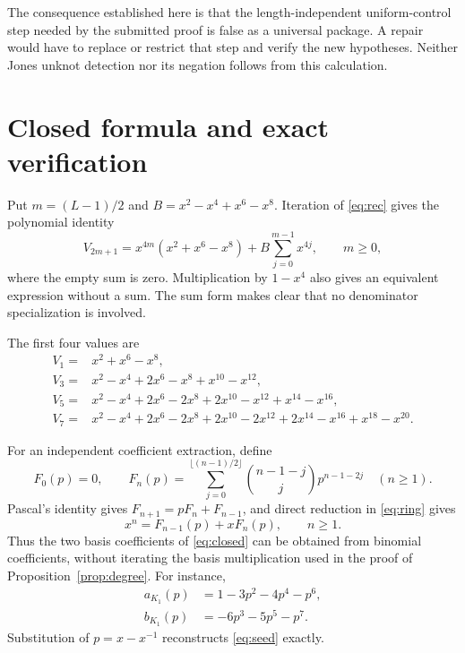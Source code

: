 \documentclass[11pt]{amsart}
\theoremstyle{remark}
\begin{document}
The consequence established here is that
the length-independent uniform-control
step needed by the submitted proof is false
as a universal package. A repair would
have to replace or restrict that step
and verify the new hypotheses. Neither
Jones unknot detection nor its negation
follows from this calculation.

\appendix
\section{Closed formula and exact verification}\label{app:verify}

Put \(m=(L-1)/2\) and \(B=x^2-x^4+x^6-x^8\).
Iteration of \eqref{eq:rec} gives the polynomial identity
\begin{equation}\label{eq:closed}
 V_{2m+1}=x^{4m}(x^2+x^6-x^8)
       +B\sum_{j=0}^{m-1}x^{4j},\qquad m\ge0,
\end{equation}
where the empty sum is zero.
Multiplication by \(1-x^4\) also gives an
equivalent expression without a sum.
The sum form makes clear that no
denominator specialization is involved.

The first four values are
\begin{align*}
 V_1={}&x^2+x^6-x^8,\\
 V_3={}&x^2-x^4+2x^6-x^8+x^{10}-x^{12},\\
 V_5={}&x^2-x^4+2x^6-2x^8+2x^{10}-x^{12}+x^{14}-x^{16},\\
 V_7={}&x^2-x^4+2x^6-2x^8+2x^{10}-2x^{12}
       +2x^{14}-x^{16}+x^{18}-x^{20}.
\end{align*}

For an independent coefficient extraction, define
\[
 F_0(p)=0,\qquad
 F_n(p)=\sum_{j=0}^{\lfloor(n-1)/2\rfloor}
 \binom{n-1-j}{j}p^{n-1-2j}\quad(n\ge1).
\]
Pascal's identity gives \(F_{n+1}=pF_n+F_{n-1}\),
and direct reduction in \eqref{eq:ring} gives
\begin{equation}\label{eq:binomial}
 x^n=F_{n-1}(p)+xF_n(p),\qquad n\ge1.
\end{equation}
Thus the two basis coefficients of
\eqref{eq:closed} can be obtained from
binomial coefficients, without iterating
the basis multiplication used in the
proof of Proposition~\ref{prop:degree}.
For instance,
\begin{align*}
 a_{K_1}(p)&=1-3p^2-4p^4-p^6,\\
 b_{K_1}(p)&=-6p^3-5p^5-p^7.
\end{align*}
Substitution of \(p=x-x^{-1}\)
reconstructs \eqref{eq:seed} exactly.
\end{document}
